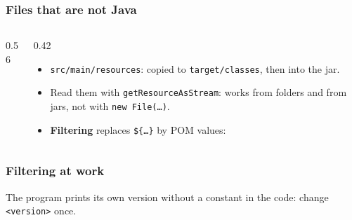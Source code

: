 \documentclass[aspectratio=169,10pt,compress]{beamer}
\begin{document}
\begin{frame}[t,fragile] \frametitle{Files that are not Java}
  \begin{columns}[T]
    \begin{column}{0.56\textwidth}
    \end{column}
    \begin{column}{0.42\textwidth}
      \begin{itemize}\small
        \item \texttt{src/main/resources}: copied to \texttt{target/classes}, then into the jar.
        \item Read them with \texttt{getResourceAsStream}: works from folders and from jars, not with \texttt{new File(\dots)}.
        \item \textbf{Filtering} replaces \texttt{\$\{\dots\}} by POM values:
      \end{itemize}
    \end{column}
  \end{columns}
\end{frame}




\begin{frame}[t,fragile] \frametitle{Filtering at work}

  \vspace{0.1em}
  \small
  The program prints its own version without a constant in the code: change \texttt{<version>} once.
\end{frame}

\end{document}
